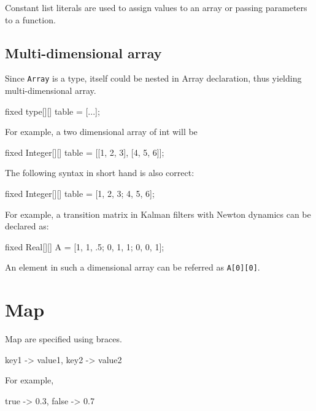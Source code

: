 \documentclass[12pt]{article}
\renewcommand{\optional}[1]{} %
\begin{document}
Constant list literals are used to assign values to an array or passing parameters to a function.

\subsection{Multi-dimensional array}
Since \texttt{Array} is a type, itself could be nested in Array declaration, thus yielding multi-dimensional array. 
\begin{blogcode}
fixed type[][] table = [...];
\end{blogcode}

For example, a two dimensional array of int will be
\begin{blogcode}
fixed Integer[][] table = [[1, 2, 3], [4, 5, 6]];
\end{blogcode}
The following syntax in short hand is also correct:
\begin{blogcode}
fixed Integer[][] table = [1, 2, 3; 4, 5, 6];
\end{blogcode}


For example, a transition matrix in Kalman  filters with Newton dynamics can be declared as:
\begin{blogcode}
fixed Real[][] A = [1, 1, .5; 0, 1, 1; 0, 0, 1];
\end{blogcode}
An element in such a dimensional array can be referred as \texttt{A[0][0]}.

\optional{
\subsection{Size of an array}
There are two special functions obtain the size of an array.
\texttt{length(\mycdot)} and \texttt{size(\mycdot)}.
\texttt{length(\mycdot)} returns the length of one dimensional array, while \texttt{size(\mycdot)} returns the lengths at all dimensions.
In the above example, \texttt{length(table)} will be 3, and \texttt{size(table)} will be \texttt{[2, 3]}.
}

\section{Map}
Map are specified using braces. 
\begin{blogcode}
{key1 -> value1, key2 -> value2}
\end{blogcode}

For example, 
\begin{blogcode}
 {true -> 0.3, false -> 0.7}
\end{blogcode}
\end{document}
